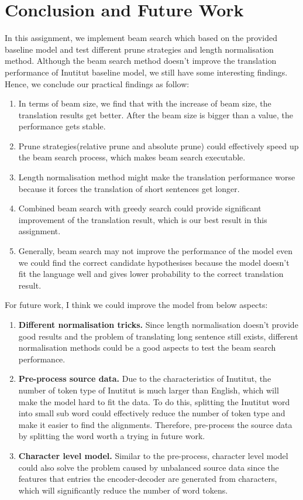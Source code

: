 \documentclass[a4paper]{article}
\begin{document}
\section{Conclusion and Future Work}
In this assignment, we implement beam search which based on the provided baseline model and test different prune strategies and length normalisation method. Although the beam search method doesn't improve the translation performance of Inutitut baseline model, we still have some interesting findings. Hence, we conclude our practical findings as follow:
\begin{enumerate}
\item In terms of beam size, we find that with the increase of beam size, the translation results get better. After the beam size is bigger than a value, the performance gets stable.
\item Prune strategies(relative prune and absolute prune) could effectively speed up the beam search process, which makes beam search executable.
\item Length normalisation method might make the translation performance worse because it forces the translation of short sentences get longer.
\item Combined beam search with greedy search could provide significant improvement of the translation result, which is our best result in this assignment. 
\item Generally, beam search may not improve the performance of the model even we could find the correct candidate hypothesises because the model doesn't fit the language well and gives lower probability to the correct translation result.
\end{enumerate}

For future work, I think we could improve the model from below aspects:
\begin{enumerate}
\item \textbf{Different normalisation tricks.} Since length normalisation doesn't provide good results and the problem of translating long sentence still exists, different normalisation methods could be a good aspects to test the beam search performance.
\item \textbf{Pre-process source data.} Due to the characteristics of Inutitut, the number of token type of Inutitut is much larger than English, which will make the model hard to fit the data. To do this, splitting the Inutitut word into small sub word could effectively reduce the number of token type and make it easier to find the alignments. Therefore, pre-process the source data by splitting the word worth a trying in future work.
\item \textbf{Character level model.} Similar to the pre-process, character level model could also solve the problem caused by unbalanced source data since the features that entries the encoder-decoder are generated from characters, which will significantly reduce the number of word tokens.  
\end{enumerate}
\end{document}
